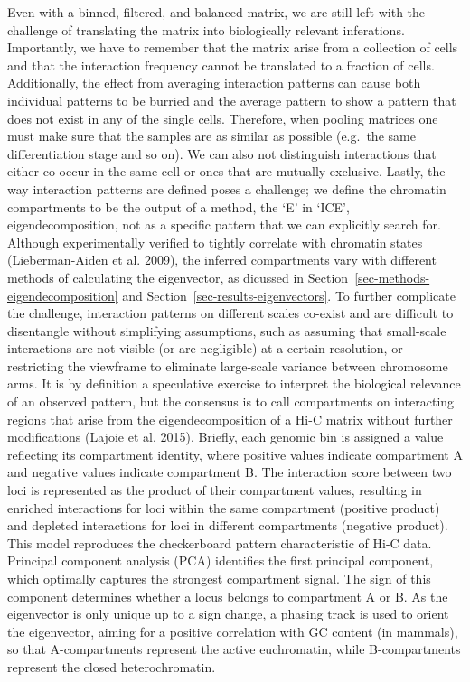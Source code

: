 \documentclass[
  11pt,
  a4paper,
]{scrbook}
\begin{document}
Even with a binned, filtered, and balanced matrix, we are still left
with the challenge of translating the matrix into biologically relevant
inferations. Importantly, we have to remember that the matrix arise from
a collection of cells and that the interaction frequency cannot be
translated to a fraction of cells. Additionally, the effect from
averaging interaction patterns can cause both individual patterns to be
burried and the average pattern to show a pattern that does not exist in
any of the single cells. Therefore, when pooling matrices one must make
sure that the samples are as similar as possible (e.g.~the same
differentiation stage and so on). We can also not distinguish
interactions that either co-occur in the same cell or ones that are
mutually exclusive. Lastly, the way interaction patterns are defined
poses a challenge; we define the chromatin compartments to be the output
of a method, the `E' in `ICE', eigendecomposition, not as a specific
pattern that we can explicitly search for. Although experimentally
verified to tightly correlate with chromatin states (Lieberman-Aiden et
al. 2009), the inferred compartments vary with different methods of
calculating the eigenvector, as dicussed in
Section~\ref{sec-methods-eigendecomposition} and
Section~\ref{sec-results-eigenvectors}. To further complicate the
challenge, interaction patterns on different scales co-exist and are
difficult to disentangle without simplifying assumptions, such as
assuming that small-scale interactions are not visible (or are
negligible) at a certain resolution, or restricting the viewframe to
eliminate large-scale variance between chromosome arms. It is by
definition a speculative exercise to interpret the biological relevance
of an observed pattern, but the consensus is to call compartments on
interacting regions that arise from the eigendecomposition of a Hi-C
matrix without further modifications (Lajoie et al. 2015). Briefly, each
genomic bin is assigned a value reflecting its compartment identity,
where positive values indicate compartment A and negative values
indicate compartment B. The interaction score between two loci is
represented as the product of their compartment values, resulting in
enriched interactions for loci within the same compartment (positive
product) and depleted interactions for loci in different compartments
(negative product). This model reproduces the checkerboard pattern
characteristic of Hi-C data. Principal component analysis (PCA)
identifies the first principal component, which optimally captures the
strongest compartment signal. The sign of this component determines
whether a locus belongs to compartment A or B. As the eigenvector is
only unique up to a sign change, a phasing track is used to orient the
eigenvector, aiming for a positive correlation with GC content (in
mammals), so that A-compartments represent the active euchromatin, while
B-compartments represent the closed heterochromatin.
\end{document}
